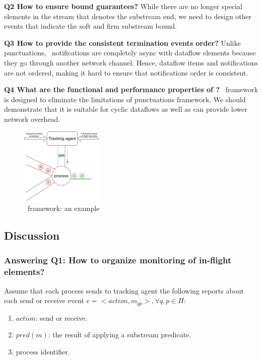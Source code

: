{\bf Q2 How to ensure bound guarantees?} While there are no longer special elements in the stream that denotes the substream end, we need to design other events that indicate the soft and firm substream bound. 

{\bf Q3 How to provide the consistent termination events order?} Unlike punctuations, \tracker\ notifications are completely async with dataflow elements because they go through another network channel. Hence, dataflow items and notifications are not ordered, making it hard to ensure that notifications order is consistent.

{\bf Q4 What are the functional and performance properties of \tracker?} \tracker\ framework is designed to eliminate the limitations of punctuations framework. We should demonstrate that it is suitable for cyclic dataflows as well as can provide lower network overhead.

\begin{figure}[htbp]
  \centering
  \includegraphics[width=0.35\textwidth]{pics/tracker-scheme.pdf}
  \caption{\tracker\ framework: an example}
  \label{tracker_scheme}
\end{figure}

\subsection{Discussion}

\subsubsection{Answering Q1: How to organize monitoring of in-flight elements?}
Assume that each process sends to tracking agent the following reports about each send or receive event $e = <action,m_{qp}>, \forall q,p \in \Pi$:
\begin{enumerate}
    \item $action$: send or receive.
    \item $pred(m)$: the result of applying a substream predicate.
    \item process identifier.
\end{enumerate}

